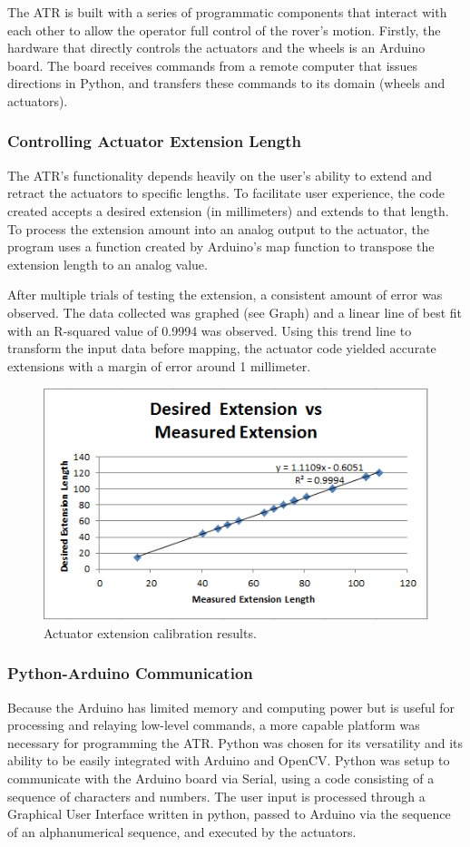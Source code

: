 \documentclass[12pt]{article}
\numberwithin{figure}{section}
\begin{document}
\begin{multicols}{2}
The ATR is built with a series of programmatic components that interact with each other to allow the operator full control of the rover’s motion. Firstly, the hardware that directly controls the actuators and the wheels is an Arduino board. The board receives commands from a remote computer that issues directions in Python, and transfers these commands to its domain (wheels and actuators). 
\subsubsection{Controlling Actuator Extension Length}
The ATR’s functionality depends heavily on the user’s ability to extend and retract the actuators to specific lengths. To facilitate user experience, the code created accepts a desired extension (in millimeters) and extends to that length. To process the extension amount into an analog output to the actuator, the program uses a function created by Arduino’s map function to transpose the extension length to an analog value.

After multiple trials of testing the extension, a consistent amount of error was observed. The data collected was graphed (see Graph) and a linear line of best fit with an R-squared value of 0.9994 was observed. Using this trend line to transform the input data before mapping, the actuator code yielded accurate extensions with a margin of error around 1 millimeter.

\begin{figure}[H]
\includegraphics[scale=0.6]{Desired_vs_Measured.PNG}
\caption{Actuator extension calibration results.}
\label{fig:actuator_calibration_graph}
\end{figure}

\subsubsection{Python-Arduino Communication}
Because the Arduino has limited memory and computing power but is useful for processing and relaying low-level commands, a more capable platform was necessary for programming the ATR. Python was chosen for its versatility and its ability to be easily integrated with Arduino and OpenCV. Python was setup to communicate with the Arduino board via Serial, using a code consisting of a sequence of characters and numbers. The user input is processed through a Graphical User Interface written in python, passed to Arduino via the sequence of an alphanumerical sequence, and executed by the actuators.

\end{multicols}
\end{document}

